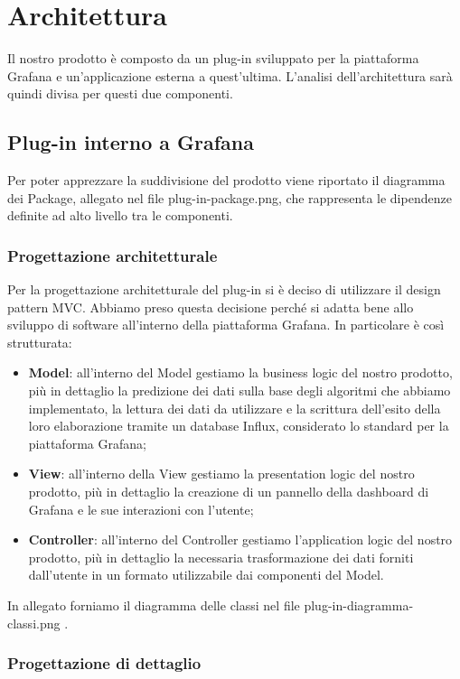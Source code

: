 \section{Architettura}
	Il nostro prodotto è composto da un plug-in sviluppato per la piattaforma Grafana e un'applicazione esterna a quest'ultima. L'analisi dell'architettura sarà quindi divisa per questi due componenti.
	\subsection{Plug-in interno a Grafana}
		Per poter apprezzare la suddivisione del prodotto viene riportato il diagramma dei Package, allegato nel file plug-in-package.png, che rappresenta le dipendenze definite ad alto livello tra le componenti.
		\subsubsection{Progettazione architetturale}
		Per la progettazione architetturale del plug-in si è deciso di utilizzare il design pattern MVC. Abbiamo preso questa decisione perché si adatta bene allo sviluppo di software all'interno della piattaforma Grafana. In particolare è così strutturata:
		\begin{itemize}
			\item \textbf{Model}: all'interno del Model gestiamo la business logic del nostro prodotto, più in dettaglio la predizione dei dati sulla base degli algoritmi che abbiamo implementato, la lettura dei dati da utilizzare e la scrittura dell'esito della loro elaborazione tramite un database Influx, considerato lo standard per la piattaforma Grafana;
			\item \textbf{View}: all'interno della View gestiamo la presentation logic del nostro prodotto, più in dettaglio la creazione di un pannello della dashboard di Grafana e le sue interazioni con l'utente;
			\item \textbf{Controller}: all'interno del Controller gestiamo l'application logic del nostro prodotto, più in dettaglio la necessaria trasformazione dei dati forniti dall'utente in un formato utilizzabile dai componenti del Model.
		\end{itemize}
		In allegato forniamo il diagramma delle classi nel file plug-in-diagramma-classi.png .
		\subsubsection{Progettazione di dettaglio}
